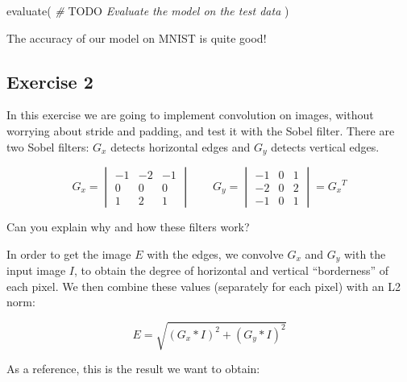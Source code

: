 \documentclass[
  a4paper,
]{article}
\newenvironment{Shaded}{\begin{snugshade}}{\end{snugshade}}
\newcommand{\AlertTok}[1]{\textcolor[rgb]{0.94,0.16,0.16}{#1}}
\newcommand{\CommentTok}[1]{\textcolor[rgb]{0.56,0.35,0.01}{\textit{#1}}}
\newcommand{\FunctionTok}[1]{\textcolor[rgb]{0.00,0.00,0.00}{#1}}
\newcommand{\NormalTok}[1]{#1}
\begin{document}
\begin{Shaded}
\begin{Highlighting}[]
\FunctionTok{evaluate}\NormalTok{(}
  \CommentTok{\# }\AlertTok{TODO}\CommentTok{ Evaluate the model on the test data}
\NormalTok{)}
\end{Highlighting}
\end{Shaded}

The accuracy of our model on MNIST is quite good!

\hypertarget{exercise-2}{%
\subsection{Exercise 2}\label{exercise-2}}

In this exercise we are going to implement convolution on images,
without worrying about stride and padding, and test it with the Sobel
filter. There are two Sobel filters: \(G_x\) detects horizontal edges
and \(G_y\) detects vertical edges.

\begin{equation}
G_x=\begin{vmatrix}
-1 & -2 & -1 \\
0 & 0 & 0 \\
1 & 2 & 1
\end{vmatrix}
\qquad
G_y=\begin{vmatrix}
-1 & 0 & 1 \\
-2 & 0 & 2 \\
-1 & 0 & 1
\end{vmatrix}={G_x}^T
\end{equation}

Can you explain why and how these filters work?

In order to get the image \(E\) with the edges, we convolve \(G_x\) and
\(G_y\) with the input image \(I\), to obtain the degree of horizontal
and vertical ``borderness'' of each pixel. We then combine these values
(separately for each pixel) with an L2 norm:

\begin{equation}
E=\sqrt{(G_x*I)^2+(G_y*I)^2}
\end{equation}

As a reference, this is the result we want to obtain:
\end{document}
